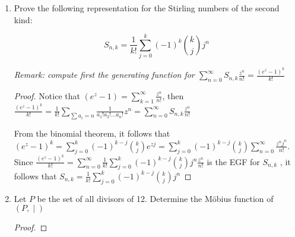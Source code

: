 \documentclass[12pt]{article}
\begin{document}
\begin{enumerate}
\begin{proof}
        We added over all possible size assignments to the sets of the partitions $P_i$, and then we remove the set labels dividing by $k!$.
        
        Now, recall that $e^z = \sum \limits_{k=0}^\infty \frac{z^k}{k!}$. This implies by substitution that $e^{u(e^z -1)} = \sum \limits_{k=0}^\infty \frac{[u (e^z-1)]^k}{k!} = \sum \limits_{k=0}^\infty \frac{u^k}{k!} [e^z-1]^k $. Notice that $e^z-1 = \sum \limits_{n = 1}^{\infty} \frac{z^n}{n!}$. We can use this information to compute $[e^z-1]^k$ as a Cauchy product. 
        
        It follows that $[z^n](e^z-1)^k = \displaystyle \sum \limits_{a_1+a_2+\ldots+ a_k =n} \frac{1}{a_1! a_2! \ldots a_k!} = \frac{k!}{n!}S_{n,k}$. This implies that $\sum \limits_{k=0}^\infty \frac{u^k}{k!} [e^z-1]^k = \displaystyle\sum \limits_{k=0}^\infty \sum \limits_{n=0}^k   S_{n,k} \frac{u^k}{n!} z^n $
    \end{proof}
    
    \item Prove the following representation for the Stirling numbers of the second kind:
    
    $$ S_{n,k} = \frac{1}{k!} \displaystyle \sum \limits_{j=0}^{k}(-1)^k {k \choose j} j^n$$
    
    \textit{Remark: compute first the generating function for $\displaystyle \sum \limits_{n=0}^{\infty} S_{n,k} \frac{z^n}{n!} = \frac{(e^z-1)^k}{k!}$}
    
    \begin{proof}
    Notice that $(e^z-1) = \displaystyle \sum_{k=1}^{\infty} \frac{z^n}{n!}$, then $\frac{(e^z-1)^k}{k!} = \displaystyle\frac{1}{k!} \sum \limits_{\sum a_i = n} \frac{1}{a_1! a_2 ! \ldots a_n!} z^n = \displaystyle \sum \limits_{n=0}^ {\infty}S_{n,k} \frac{z^n}{n!}$
    
    From the binomial theorem, it follows that $(e^z -1)^ k = \displaystyle \sum\limits_{j=0}^{k} (-1)^{k-j}{k \choose j}e^{zj} = \displaystyle \sum \limits_{j=0}^{k} (-1)^{k-j}{k \choose j} \displaystyle\sum_{n=0}^{\infty}\frac{z^n j^n}{n!} $. Since $\frac{(e^z-1)^k}{k!}= \displaystyle \sum_{n=0}^{\infty}\displaystyle  \frac{1}{k!}\sum \limits_{j=0}^{k} (-1)^{k-j}{k \choose j} j^n\frac{z^n }{n!} $ is the EGF for $S_{n,k}$ , it follows that $S_{n,k} = \displaystyle\frac{1}{k!}\sum \limits_{j=0}^{k} (-1)^{k-j}{k \choose j} j^n$
    \end{proof}
    
    \item Let $P$ be the set of all divisors of 12. Determine the Möbius function of $(P, \; \vert \;)$
    \begin{proof}
        

\end{proof}
\end{enumerate}
\end{document}

